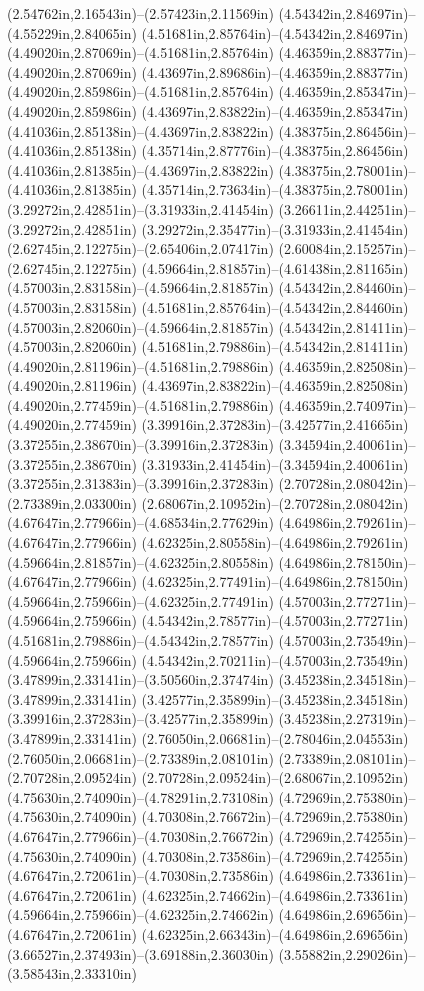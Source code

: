 (2.54762in,2.16543in)--(2.57423in,2.11569in) (4.54342in,2.84697in)--(4.55229in,2.84065in) (4.51681in,2.85764in)--(4.54342in,2.84697in) (4.49020in,2.87069in)--(4.51681in,2.85764in) (4.46359in,2.88377in)--(4.49020in,2.87069in) (4.43697in,2.89686in)--(4.46359in,2.88377in) (4.49020in,2.85986in)--(4.51681in,2.85764in) (4.46359in,2.85347in)--(4.49020in,2.85986in) (4.43697in,2.83822in)--(4.46359in,2.85347in) (4.41036in,2.85138in)--(4.43697in,2.83822in) (4.38375in,2.86456in)--(4.41036in,2.85138in) (4.35714in,2.87776in)--(4.38375in,2.86456in) (4.41036in,2.81385in)--(4.43697in,2.83822in) (4.38375in,2.78001in)--(4.41036in,2.81385in) (4.35714in,2.73634in)--(4.38375in,2.78001in) (3.29272in,2.42851in)--(3.31933in,2.41454in) (3.26611in,2.44251in)--(3.29272in,2.42851in) (3.29272in,2.35477in)--(3.31933in,2.41454in) (2.62745in,2.12275in)--(2.65406in,2.07417in) (2.60084in,2.15257in)--(2.62745in,2.12275in) (4.59664in,2.81857in)--(4.61438in,2.81165in) (4.57003in,2.83158in)--(4.59664in,2.81857in) (4.54342in,2.84460in)--(4.57003in,2.83158in) (4.51681in,2.85764in)--(4.54342in,2.84460in) (4.57003in,2.82060in)--(4.59664in,2.81857in) (4.54342in,2.81411in)--(4.57003in,2.82060in) (4.51681in,2.79886in)--(4.54342in,2.81411in) (4.49020in,2.81196in)--(4.51681in,2.79886in) (4.46359in,2.82508in)--(4.49020in,2.81196in) (4.43697in,2.83822in)--(4.46359in,2.82508in) (4.49020in,2.77459in)--(4.51681in,2.79886in) (4.46359in,2.74097in)--(4.49020in,2.77459in) (3.39916in,2.37283in)--(3.42577in,2.41665in) (3.37255in,2.38670in)--(3.39916in,2.37283in) (3.34594in,2.40061in)--(3.37255in,2.38670in) (3.31933in,2.41454in)--(3.34594in,2.40061in) (3.37255in,2.31383in)--(3.39916in,2.37283in) (2.70728in,2.08042in)--(2.73389in,2.03300in) (2.68067in,2.10952in)--(2.70728in,2.08042in) (4.67647in,2.77966in)--(4.68534in,2.77629in) (4.64986in,2.79261in)--(4.67647in,2.77966in) (4.62325in,2.80558in)--(4.64986in,2.79261in) (4.59664in,2.81857in)--(4.62325in,2.80558in) (4.64986in,2.78150in)--(4.67647in,2.77966in) (4.62325in,2.77491in)--(4.64986in,2.78150in) (4.59664in,2.75966in)--(4.62325in,2.77491in) (4.57003in,2.77271in)--(4.59664in,2.75966in) (4.54342in,2.78577in)--(4.57003in,2.77271in) (4.51681in,2.79886in)--(4.54342in,2.78577in) (4.57003in,2.73549in)--(4.59664in,2.75966in) (4.54342in,2.70211in)--(4.57003in,2.73549in) (3.47899in,2.33141in)--(3.50560in,2.37474in) (3.45238in,2.34518in)--(3.47899in,2.33141in) (3.42577in,2.35899in)--(3.45238in,2.34518in) (3.39916in,2.37283in)--(3.42577in,2.35899in) (3.45238in,2.27319in)--(3.47899in,2.33141in) (2.76050in,2.06681in)--(2.78046in,2.04553in) (2.76050in,2.06681in)--(2.73389in,2.08101in) (2.73389in,2.08101in)--(2.70728in,2.09524in) (2.70728in,2.09524in)--(2.68067in,2.10952in) (4.75630in,2.74090in)--(4.78291in,2.73108in) (4.72969in,2.75380in)--(4.75630in,2.74090in) (4.70308in,2.76672in)--(4.72969in,2.75380in) (4.67647in,2.77966in)--(4.70308in,2.76672in) (4.72969in,2.74255in)--(4.75630in,2.74090in) (4.70308in,2.73586in)--(4.72969in,2.74255in) (4.67647in,2.72061in)--(4.70308in,2.73586in) (4.64986in,2.73361in)--(4.67647in,2.72061in) (4.62325in,2.74662in)--(4.64986in,2.73361in) (4.59664in,2.75966in)--(4.62325in,2.74662in) (4.64986in,2.69656in)--(4.67647in,2.72061in) (4.62325in,2.66343in)--(4.64986in,2.69656in) (3.66527in,2.37493in)--(3.69188in,2.36030in) (3.55882in,2.29026in)--(3.58543in,2.33310in) 
